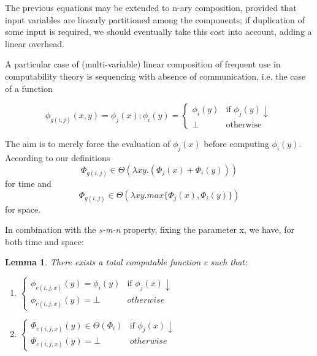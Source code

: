 \documentclass[10pt, a4paper, oneside, titlepage, draft]{article}
\newtheorem{lemma}[shrd]{Lemma}
\begin{document}
The previous equations may be extended to n-ary composition, provided that input variables are linearly partitioned among the components; if duplication of some input is required, we should eventually take this cost into account, adding a linear overhead. 

A particular case of (multi-variable) linear composition of frequent use in computability theory is sequencing with absence of communication, i.e. the case of a function

\begin{equation*}
    \phi_{g(i,j)}(x,y) = \phi_j(x);\phi_i(y) = 
    \begin{cases}
        \phi_i(y)   & \text{if } \phi_j(y)\downarrow    \\
        \bot        & \text{otherwise}
    \end{cases}
\end{equation*}

\noindent The aim is to merely force the evaluation of $\phi_j(x)$ before computing $\phi_i(y)$. According to our definitions
\begin{equation*}
    \Phi_{g(i,j)} \in \Theta ( \lambda xy . ( \Phi_j(x) + \Phi_i(y) ) )
\end{equation*}
for time and
\begin{equation*}
    \Phi_{g(i,j)} \in \Theta ( \lambda xy . max \{ \Phi_j(x) , \Phi_i(y) \} )
\end{equation*}
for space.

In combination with the \emph{s-m-n} property, fixing the parameter x, we have, for both time and space:

\begin{lemma}
    There exists a total computable function c such that:
    \begin{enumerate}[label=(\alph*)]
        \item $
            \begin{cases}
                \phi_{c(i,j,x)}(y) = \phi_i(y)  & \text{if  } \phi_j(x)\downarrow \\
                \phi_{c(i,j,x)}(y) = \bot       & otherwise
            \end{cases}
        $

        \item $
            \begin{cases}
                \Phi_{c(i,j,x)}(y) \in \Theta ( \Phi_i )  & \text{if  } \phi_j(x)\downarrow \\
                \Phi_{c(i,j,x)}(y) = \bot       & otherwise
            \end{cases}
        $
    \end{enumerate}
\end{lemma}
\end{document}
